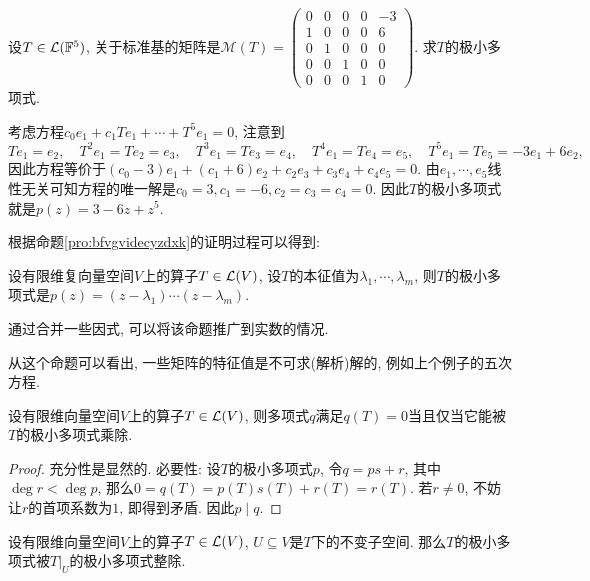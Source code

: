 \begin{example}
	设$T \in \mathcal{L} (\mathbb{F} ^5)$, 关于标准基的矩阵是$\mathcal{M}(T) =  \begin{pmatrix}
 0 & 0 & 0 & 0 & -3 \\
 1 & 0 & 0 & 0 & 6 \\
 0 & 1 & 0 & 0 & 0 \\
 0 & 0 & 1 & 0 & 0 \\
 0 & 0 & 0 & 1 & 0
\end{pmatrix}$. 求$T$的极小多项式. 
\end{example}
\begin{solution}
	考虑方程$c_0e_1+c_1Te_1 + \cdots + T^5e_1 = 0$, 注意到$$Te_1=e_2,\quad T^2e_1=Te_2=e_3,\quad T^3e_1=Te_3=e_4,\quad T^4e_1=Te_4=e_5,\quad T^5e_1=Te_5=-3e_1+6e_2, $$
	因此方程等价于$(c_0-3)e_1+(c_1+6)e_2+c_2e_3+c_3e_4+c_4e_5=0$. 由$e_1,\cdots ,e_5$线性无关可知方程的唯一解是$c_0=3,c_1=-6,c_2=c_3=c_4=0$. 因此$T$的极小多项式就是$p(z)=3-6z+z^5$. 
\end{solution}

根据命题\ref{pro:bfvgvidecyzdxk}的证明过程可以得到: 

\begin{proposition}{}
	设有限维复向量空间$V$上的算子$T \in \mathcal{L} (V)$, 设$T$的本征值为$\lambda _1,\cdots ,\lambda _m$, 则$T$的极小多项式是$p(z)=(z-\lambda _1) \cdots (z-\lambda _m)$. 
\end{proposition}
\begin{remark}
	通过合并一些因式, 可以将该命题推广到实数的情况. 
\end{remark}
\begin{remark}
	从这个命题可以看出, 一些矩阵的特征值是不可求(解析)解的, 例如上个例子的五次方程. 
\end{remark}

\begin{proposition}{}
	设有限维向量空间$V$上的算子$T \in \mathcal{L} (V)$, 则多项式$q$满足$q(T)=0$当且仅当它能被$T$的极小多项式乘除. 
\end{proposition}
\begin{proof}
	充分性是显然的. 必要性: 设$T$的极小多项式$p$, 令$q=ps+r$, 其中$\deg r < \deg p$, 那么$0=q(T)=p(T)s(T)+r(T)=r(T)$. 若$r \neq 0$, 不妨让$r$的首项系数为$1$, 即得到矛盾. 因此$p \mid q$. 
\end{proof}

\begin{corollary}{}
	设有限维向量空间$V$上的算子$T \in \mathcal{L} (V)$, $U \subseteq V$是$T$下的不变子空间. 那么$T$的极小多项式被$T|_U$的极小多项式整除. 
\end{corollary}


